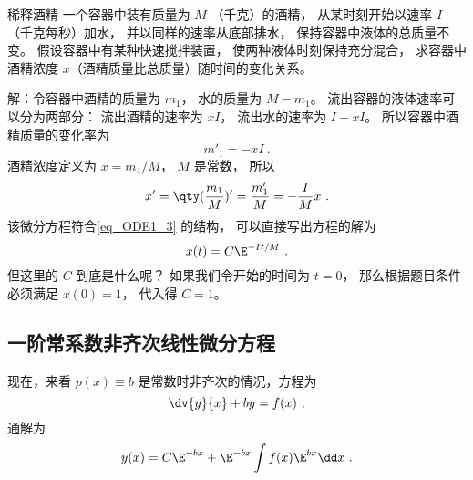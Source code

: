 \begin{example}{稀释酒精}
一个容器中装有质量为 $M$ （千克）的酒精， 从某时刻开始以速率 $I$ （千克每秒）加水， 并以同样的速率从底部排水， 保持容器中液体的总质量不变。 假设容器中有某种快速搅拌装置， 使两种液体时刻保持充分混合， 求容器中酒精浓度 $x$（酒精质量比总质量）随时间的变化关系。

解：令容器中酒精的质量为 $m_1$， 水的质量为 $M - m_1$。 流出容器的液体速率可以分为两部分： 流出酒精的速率为 $xI$， 流出水的速率为 $I - xI$。 所以容器中酒精质量的变化率为
\begin{equation}
m'_1 = -xI~.
\end{equation}
酒精浓度定义为 $x = m_1/M$， $M$ 是常数， 所以
\begin{equation}
x' = \qty(\frac{m_1}{M})' = \frac{m'_1}{M} = -\frac{I}{M}x~.
\end{equation}
该微分方程符合\autoref{eq_ODE1_3} 的结构， 可以直接写出方程的解为
\begin{equation}
x(t) = C\E^{-It/M}~.
\end{equation}
但这里的 $C$ 到底是什么呢？ 如果我们令开始的时间为 $t = 0$， 那么根据题目条件必须满足 $x(0) = 1$， 代入得 $C = 1$。
\end{example}

\subsection{一阶常系数非齐次线性微分方程}
现在，来看 $p(x) \equiv b$ 是常数时非齐次的情况，方程为
\begin{equation}\label{eq_ODE1_4}
\dv{y}{x} + by = f(x)~,
\end{equation}
通解为
\begin{equation}\label{eq_ODE1_13}
y(x)=C\E^{-bx}+\E^{-bx}\int f(x)\E^{bx}\dd x~.
\end{equation}

